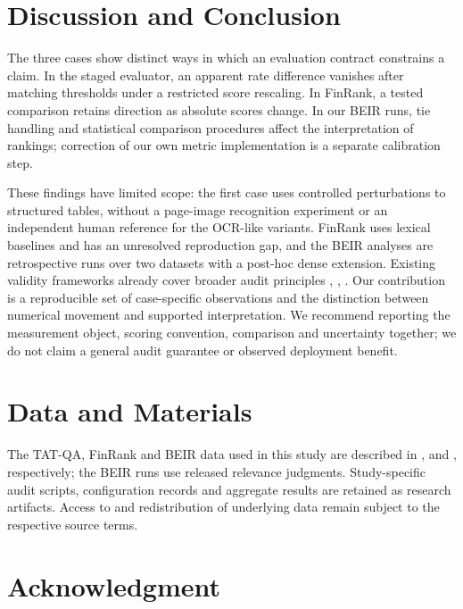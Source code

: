 \documentclass[runningheads]{llncs}
\begin{document}
\section{Discussion and Conclusion}\label{discussion-and-conclusion}

The three cases show distinct ways in which an evaluation contract
constrains a claim. In the staged evaluator, an apparent rate difference
vanishes after matching thresholds under a restricted score rescaling.
In FinRank, a tested comparison retains direction as absolute scores
change. In our BEIR runs, tie handling and statistical comparison
procedures affect the interpretation of rankings; correction of our own
metric implementation is a separate calibration step.

These findings have limited scope: the first case uses controlled
perturbations to structured tables, without a page-image recognition
experiment or an independent human reference for the OCR-like variants.
FinRank uses lexical baselines and has an unresolved reproduction gap,
and the BEIR analyses are retrospective runs over two datasets with a
post-hoc dense extension. Existing validity frameworks already cover
broader audit principles \cite{r3}, \cite{r4}, \cite{r5}. Our
contribution is a reproducible set of case-specific observations and the
distinction between numerical movement and supported interpretation. We
recommend reporting the measurement object, scoring convention,
comparison and uncertainty together; we do not claim a general audit
guarantee or observed deployment benefit.

\section{Data and Materials}\label{data-and-materials}

The TAT-QA, FinRank and BEIR data used in this study are described in
\cite{r9}, \cite{r1} and \cite{r2}, respectively; the BEIR runs use
released relevance judgments. Study-specific audit scripts,
configuration records and aggregate results are retained as research
artifacts. Access to and redistribution of underlying data remain
subject to the respective source terms.

\section*{Acknowledgment}
\end{document}
